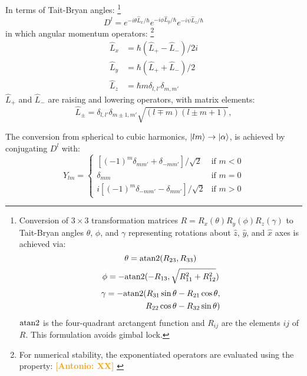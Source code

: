 \documentclass[twocolumn,showpacs,preprintnumbers,superscriptaddress,prb,floatfix,aps,10pt]{revtex4-1}
\newcommand{\abmei}[1]{\textcolor{orange}{ \bf [Antonio: #1] }}
\newcommand*{\wignerDl}{D^{l}}%
\newcommand*{\x}{\times}
\begin{document}
In terms of Tait-Bryan angles:
%
\footnote{
Conversion of $3\x3$ transformation matrices $R = R_x(\theta)R_y(\phi)R_z(\gamma)$ to Tait-Bryan angles $\theta$, $\phi$, and $\gamma$ representing rotations about $\hat{z}$, $\hat{y}$, and $\hat{x}$ axes is achieved via:
\begin{equation}
\theta = {\rm atan2}(R_{23},R_{33})
\end{equation}
\begin{equation}
\phi   =-{\rm atan2}(-R_{13},\sqrt{R_{11}^2+R_{12}^2})
\end{equation}
\begin{equation}
\begin{split}
\gamma =-{\rm atan2}(R_{31}\sin{\theta}-R_{21}\cos{\theta}, \\ 
       \quad         R_{22}\cos{\theta}-R_{32}\sin{\theta})
\end{split}
\end{equation}
${\rm atan2}$ is the four-quadrant arctangent function and $R_{ij}$ are the elements $ij$ of $R$. This formulation avoids gimbal lock.} 
%
\begin{equation}
\wignerDl = e^{-i\theta\hat{L}_x/\hbar} e^{-i\phi\hat{L}_y/\hbar} e^{-i\psi\hat{L}_z/\hbar}
\end{equation}
%
in which angular momentum operators:
%
\footnote{For numerical stability, the exponentiated operators are evaluated using the property: \abmei{XX} } \cite{shankar_fundamentals_2014}
%
\begin{align}
\label{eq:angular_momenta}
\hat{L}_x & = \hbar (\hat{L}_{+}-\hat{L}_{-})/2i \\
\hat{L}_y & = \hbar (\hat{L}_{+}+\hat{L}_{-})/2  \\
\hat{L}_z & = \hbar m \delta_{l,l'}\delta_{m,m'}
\end{align}
$\hat{L}_+$ and $\hat{L}_-$ are raising and lowering operators, with matrix elements:
\begin{equation}
\label{eq:raising_lowering_operator}
\hat{L}_{\pm} = \delta_{l,l'}\delta_{m\pm1,m'} \sqrt{(l\mp m)(l\pm m+1)},
\end{equation}









The conversion from spherical to cubic harmonics, $\ket{lm} \rightarrow \ket{\alpha}$, is achieved by conjugating $\wignerDl$ with:
\begin{equation}
\label{eq:cubic_harmonics}
Y_{lm} = 
\begin{cases}
  [(-1)^{m}\delta_{ mm'}+\delta_{-mm'}]/\sqrt{2} & \text{if } m < 0 \\
\delta_{mm}                                      & \text{if } m = 0 \\
 i[(-1)^{m}\delta_{-mm'}-\delta_{ mm'}]/\sqrt{2} & \text{if } m > 0
\end{cases}
\end{equation}
\end{document}
